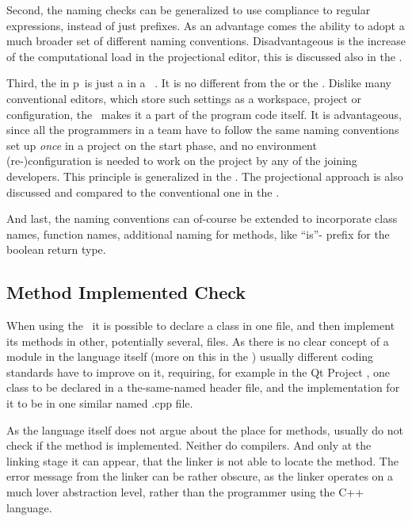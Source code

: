 Second, the naming checks can be generalized to use compliance to regular expressions, instead of just prefixes. As an advantage comes the
ability to adopt a much broader set of different naming conventions. Disadvantageous is the increase
of the computational load in the projectional editor, this is discussed also in the .

Third, the  in p\pcpp\ is just a  in a \jbmps\ . It is no different from the 
or the  . Dislike many conventional editors, which store such settings as a workspace, project or  configuration, the
\pcpp\ makes it a part of the program code itself. It is advantageous, since all the programmers in a team have to follow the 
same naming conventions set up \emph{once} in a project on the start phase, and no environment (re-)configuration is needed to work on the project by
any of the joining developers. This principle is generalized in the . 
The projectional approach is also discussed and compared to the conventional one in the .

And last, the naming conventions can of-course be extended to incorporate class names, function names, additional naming for methods,
like ``is''- prefix for the boolean return type. 


\subsection{Method Implemented Check}
\label{implementedcheck}

When using the \cpppl\ it is possible to declare a class in one file, and then implement its methods in other, potentially
several, files. As there is no clear concept of a module in the language itself (more on this in the ) usually 
different coding standards have to improve on it, requiring, for example in the Qt Project \cite{qtcodingguide}, one class to be 
declared in a the-same-named header file, and the implementation for it to be in one similar named .cpp file.

As the language itself does not argue about the place for methods,  usually do not check if the method is implemented.
Neither do compilers. And only at the linking stage it can appear, that the linker is not able to locate the method. The error
message from the linker can be rather obscure, as the linker operates on a much lover abstraction level, rather than the programmer 
using the C++ language. 

